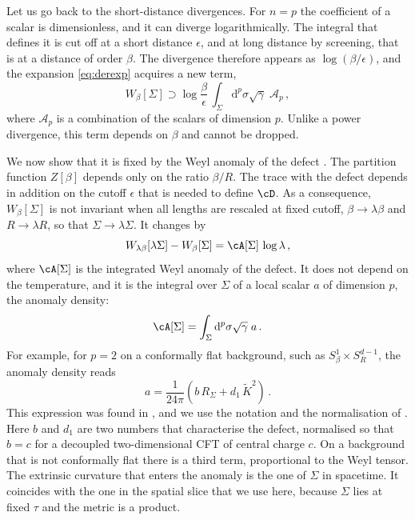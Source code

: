 \documentclass[a4paper,11pt]{article}
\newcommand{\Kt}{\widetilde{K}}
\newcommand{\dd}{\mathrm{d}}
\begin{document}
Let us go back to the short-distance divergences. For $n=p$ the coefficient of a scalar is dimensionless, and it can diverge logarithmically. The integral that defines it is cut off at a short distance $\epsilon$, and at long distance by screening, that is at a distance of order $\beta$. The divergence therefore appears as $\log(\beta/\epsilon)$, and the expansion \eqref{eq:derexp} acquires a new term,
\begin{equation}\label{eq:logform}
	W_\beta[\Sigma]\supset\log\frac{\beta}{\epsilon}\,\int_\Sigma\dd^p\sigma\sqrt\gamma\;\mathcal{A}_p\, ,
\end{equation}
where $\mathcal{A}_p$ is a combination of the scalars of dimension $p$. Unlike a power divergence, this term depends on $\beta$ and cannot be dropped.

We now show that it is fixed by the Weyl anomaly of the defect \cite{Deser:1993yx,Jensen:2015swa,Chalabi:2021jud,Wang:2021mdq}. The partition function $Z[\beta]$ depends only on the ratio $\beta/R$. The trace with the defect depends in addition on the cutoff $\epsilon$ that is needed to define $\cD$. As a consequence, $W_\beta[\Sigma]$ is not invariant when all lengths are rescaled at fixed cutoff, $\beta\to\lambda\beta$ and $R\to\lambda R$, so that $\Sigma\to\lambda\Sigma$. It changes by
\begin{equation}\label{eq:anomaly}
	W_{\lambda\beta}[\lambda\Sigma]-W_\beta[\Sigma]=\cA[\Sigma]\,\log\lambda\, ,
\end{equation}
where $\cA[\Sigma]$ is the integrated Weyl anomaly of the defect. It does not depend on the temperature, and it is the integral over $\Sigma$ of a local scalar $a$ of dimension $p$, the anomaly density:
\begin{equation}\label{eq:anomalyp2}
	\cA[\Sigma]=\int_\Sigma\dd^p\sigma\sqrt\gamma\;a\, .
\end{equation}
For example, for $p = 2$ on a conformally flat background, such as $S^1_\beta\times S^{d-1}_R$, the anomaly density reads 
\begin{equation}
	a = \frac{1}{24 \pi } \left(b \, R_\Sigma + d_1 \, \Kt^2\right)\,.
\end{equation} 
This expression was found in \cite{Graham:1999pm,Schwimmer:2008yh}, and we use the notation and the normalisation of \cite{Jensen:2015swa}.
Here $b$ and $d_1$ are two numbers that characterise the defect, normalised so that $b=c$ for a decoupled two-dimensional CFT of central charge $c$. On a background that is not conformally flat there is a third term, proportional to the Weyl tensor. The extrinsic curvature that enters the anomaly is the one of $\Sigma$ in spacetime. It coincides with the one in the spatial slice that we use here, because $\Sigma$ lies at fixed $\tau$ and the metric is a product.
\end{document}
